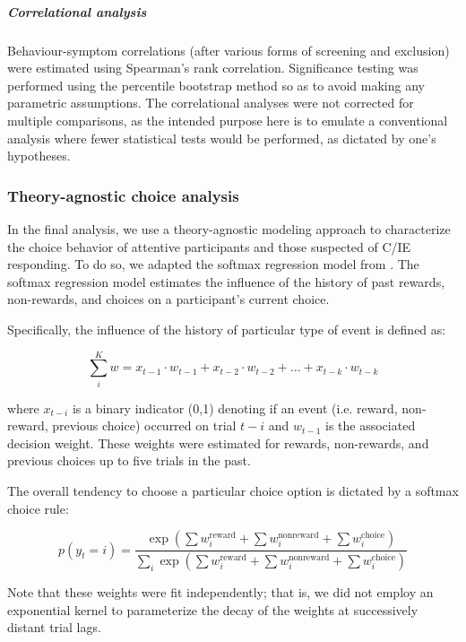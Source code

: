 \documentclass[a4paper,notitlepage,12pt]{article}
\begin{document}
\subparagraph{Correlational analysis} Behaviour-symptom correlations (after various forms of screening and exclusion) were estimated using Spearman's rank correlation. Significance testing was performed using the percentile bootstrap method \cite{wilcox2018guide} so as to avoid making any parametric assumptions. The correlational analyses were not corrected for multiple comparisons, as the intended purpose here is to emulate a conventional analysis where fewer statistical tests would be performed, as dictated by one's hypotheses.

\subsubsection{Theory-agnostic choice analysis} In the final analysis, we use a theory-agnostic modeling approach to characterize the choice behavior of attentive participants and those suspected of C/IE responding. To do so, we adapted the softmax regression model from \cite{seymour2012serotonin}. The softmax regression model estimates the influence of the history of past rewards, non-rewards, and choices on a participant's current choice. 

Specifically, the influence of the history of particular type of event is defined as:

\begin{equation*}
    \sum_i^K w = x_{t-1} \cdot w_{t-1} + x_{t-2} \cdot w_{t-2} +  \ldots + x_{t-k} \cdot w_{t-k}
\end{equation*}

where $x_{t-i}$ is a binary indicator (0,1) denoting if an event (i.e. reward, non-reward, previous choice) occurred on trial $t-i$ and $w_{t-1}$ is the associated decision weight. These weights were estimated for rewards, non-rewards, and previous choices up to five trials in the past. 

The overall tendency to choose a particular choice option is dictated by a softmax choice rule:

\begin{equation*}
    p(y_t = i) = \frac{ \exp \left( \sum w_i^\text{reward} + \sum w_i^\text{nonreward} + \sum w_i^\text{choice} \right) }{ \sum_i \exp \left( \sum w_i^\text{reward} + \sum w_i^\text{nonreward} + \sum w_i^\text{choice} \right) }
\end{equation*}

Note that these weights were fit independently; that is, we did not employ an exponential kernel to parameterize the decay of the weights at successively distant trial lags.
\end{document}
